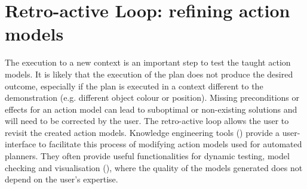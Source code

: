 \section{Retro-active Loop: refining action models}
The execution to a new context is an important step to test the taught action models.
It is likely that the execution of the plan does not produce the desired outcome, especially if the plan is executed in a context different to the demonstration (e.g. different object colour or position).
Missing preconditions or effects for an action model can lead to suboptimal or non-existing solutions and will need to be corrected by the user.
The retro-active loop allows the user to revisit the created action models.
Knowledge engineering tools () provide a user-interface to facilitate this process of modifying action models used for automated planners.
They often provide useful functionalities for dynamic testing, model checking and visualisation (\cite{simpson2007planning}), where the quality of the models generated does not depend on the user's expertise.
